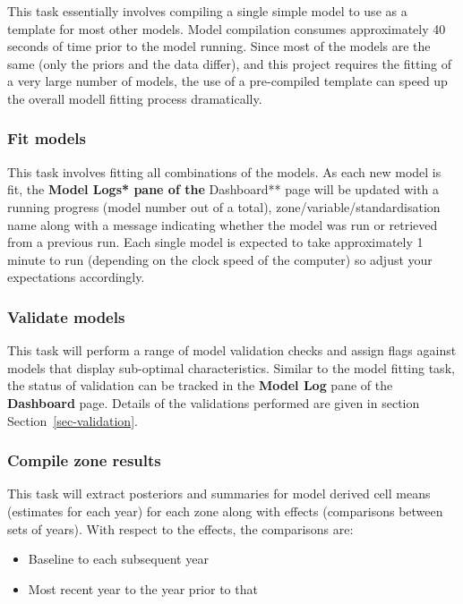 \documentclass[
  8pt,
  a4paper]{article}
\providecommand{\tightlist}{%
  \setlength{\itemsep}{0pt}\setlength{\parskip}{0pt}}
\begin{document}
This task essentially involves compiling a single simple model to use as
a template for most other models. Model compilation consumes
approximately 40 seconds of time prior to the model running. Since most
of the models are the same (only the priors and the data differ), and
this project requires the fitting of a very large number of models, the
use of a pre-compiled template can speed up the overall modell fitting
process dramatically.

\subsubsection{Fit models}\label{fit-models}

This task involves fitting all combinations of the models. As each new
model is fit, the \textbf{Model Logs* pane of the }Dashboard** page will
be updated with a running progress (model number out of a total),
zone/variable/standardisation name along with a message indicating
whether the model was run or retrieved from a previous run. Each single
model is expected to take approximately 1 minute to run (depending on
the clock speed of the computer) so adjust your expectations
accordingly.

\subsubsection{Validate models}\label{validate-models}

This task will perform a range of model validation checks and assign
flags against models that display sub-optimal characteristics. Similar
to the model fitting task, the status of validation can be tracked in
the \textbf{Model Log} pane of the \textbf{Dashboard} page. Details of
the validations performed are given in section
Section~\ref{sec-validation}.

\subsubsection{Compile zone results}\label{compile-zone-results}

This task will extract posteriors and summaries for model derived cell
means (estimates for each year) for each zone along with effects
(comparisons between sets of years). With respect to the effects, the
comparisons are:

\begin{itemize}
\tightlist
\item
  Baseline to each subsequent year
\item
  Most recent year to the year prior to that
\end{itemize}
\end{document}
